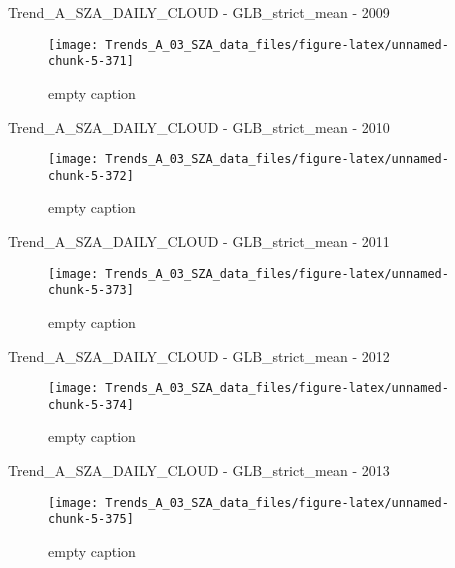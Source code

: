 \documentclass[
  10pt,
  a4paper,oneside]{article}
\begin{document}
Trend\_A\_SZA\_DAILY\_CLOUD - GLB\_strict\_mean - 2009

\begin{figure}[!ht]

{\centering \texttt{[image: Trends\_A\_03\_SZA\_data\_files/figure-latex/unnamed-chunk-5-371]} 

}

\caption{ empty caption }\label{fig:unnamed-chunk-5-371}
\end{figure}

Trend\_A\_SZA\_DAILY\_CLOUD - GLB\_strict\_mean - 2010

\begin{figure}[!ht]

{\centering \texttt{[image: Trends\_A\_03\_SZA\_data\_files/figure-latex/unnamed-chunk-5-372]} 

}

\caption{ empty caption }\label{fig:unnamed-chunk-5-372}
\end{figure}

Trend\_A\_SZA\_DAILY\_CLOUD - GLB\_strict\_mean - 2011

\begin{figure}[!ht]

{\centering \texttt{[image: Trends\_A\_03\_SZA\_data\_files/figure-latex/unnamed-chunk-5-373]} 

}

\caption{ empty caption }\label{fig:unnamed-chunk-5-373}
\end{figure}

Trend\_A\_SZA\_DAILY\_CLOUD - GLB\_strict\_mean - 2012

\begin{figure}[!ht]

{\centering \texttt{[image: Trends\_A\_03\_SZA\_data\_files/figure-latex/unnamed-chunk-5-374]} 

}

\caption{ empty caption }\label{fig:unnamed-chunk-5-374}
\end{figure}

Trend\_A\_SZA\_DAILY\_CLOUD - GLB\_strict\_mean - 2013

\begin{figure}[!ht]

{\centering \texttt{[image: Trends\_A\_03\_SZA\_data\_files/figure-latex/unnamed-chunk-5-375]} 

}

\caption{ empty caption }\label{fig:unnamed-chunk-5-375}
\end{figure}
\end{document}
